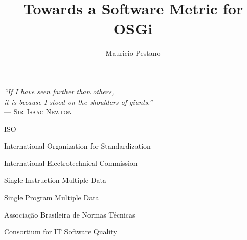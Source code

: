 \documentclass[cic,dipl,english]{iiufrgs} %
\title{Towards a Software Metric for OSGi}
\author{Mauricio Pestano}{Rafael}
\begin{document}
\maketitle

\clearpage
\begin{flushright}
\mbox{}\vfill
{\sffamily\itshape
``If I have seen farther than others,\\
it is because I stood on the shoulders of giants.''\\}
--- \textsc{Sir~Isaac Newton}
\end{flushright}





\tableofcontents





\listoffigures

\listoftables

\begin{listofabbrv}{ISO}
        \item[ISO] International Organization for Standardization
        \item[IEC] International Electrotechnical Commission
        \item[SIMD] Single Instruction Multiple Data
        \item[SPMD] Single Program Multiple Data
        \item[ABNT] Associação Brasileira de Normas Técnicas
        \item[CISQ] Consortium for IT Software Quality 
\end{listofabbrv}





 
\end{document}
